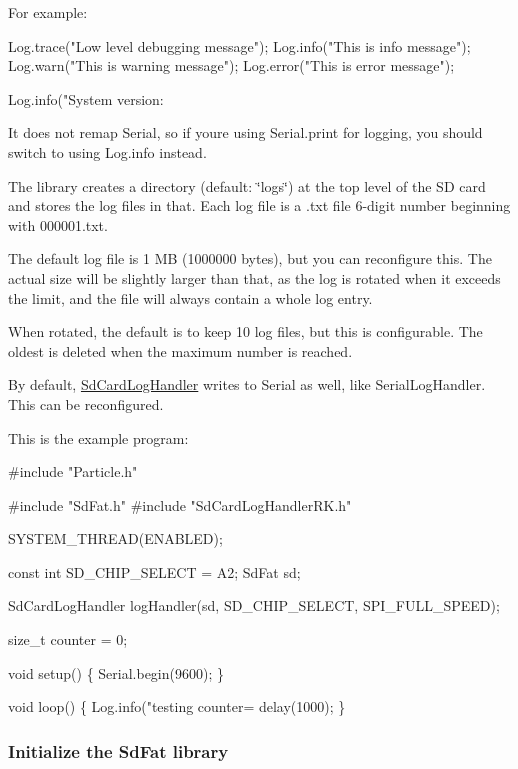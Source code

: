 For example\+:


\begin{DoxyCode}
Log.trace("Low level debugging message");
Log.info("This is info message");
Log.warn("This is warning message");
Log.error("This is error message");

Log.info("System version: %
\end{DoxyCode}


It does not remap Serial, so if you\textquotesingle{}re using Serial.\+print for logging, you should switch to using Log.\+info instead.

The library creates a directory (default\+: \char`\"{}logs\char`\"{}) at the top level of the SD card and stores the log files in that. Each log file is a .txt file 6-\/digit number beginning with 000001.\+txt.

The default log file is 1 MB (1000000 bytes), but you can reconfigure this. The actual size will be slightly larger than that, as the log is rotated when it exceeds the limit, and the file will always contain a whole log entry.

When rotated, the default is to keep 10 log files, but this is configurable. The oldest is deleted when the maximum number is reached.

By default, \mbox{\hyperlink{class_sd_card_log_handler}{Sd\+Card\+Log\+Handler}} writes to Serial as well, like Serial\+Log\+Handler. This can be reconfigured.

This is the example program\+:


\begin{DoxyCode}
#include "Particle.h"

#include "SdFat.h"
#include "SdCardLogHandlerRK.h"

SYSTEM\_THREAD(ENABLED);

const int SD\_CHIP\_SELECT = A2;
SdFat sd;

SdCardLogHandler logHandler(sd, SD\_CHIP\_SELECT, SPI\_FULL\_SPEED);

size\_t counter = 0;

void setup() \{
    Serial.begin(9600);
\}

void loop() \{
    Log.info("testing counter=%
    delay(1000);
\}
\end{DoxyCode}


\subsubsection*{Initialize the Sd\+Fat library}

